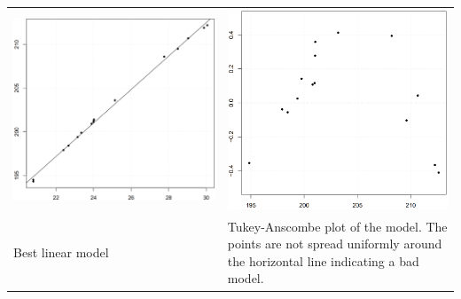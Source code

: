 \begin{table}[H]
  \setlength{\tabcolsep}{0.2em}
  \scriptsize
  \begin{tabular}{p{}@{\hskip 1em}p{}}
    \includegraphics[width=\linewidth]{Pics/8.2.1.png}& \includegraphics[width=\linewidth]{Pics/8.2.2.png} \\
    Best linear model &
    Tukey-Anscombe plot of the model. The points are not spread uniformly around the horizontal line indicating a bad model.\\
  \end{tabular}
\end{table}

